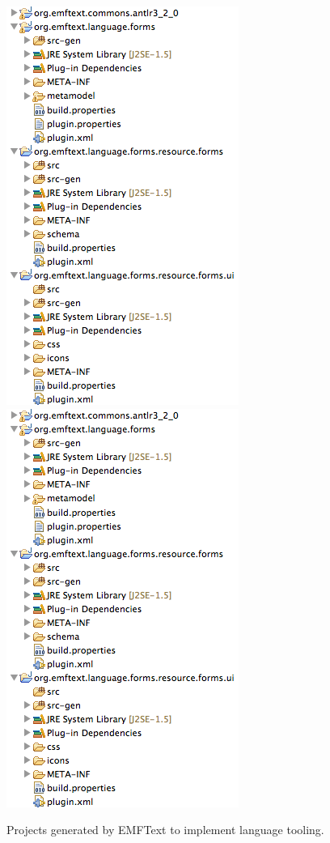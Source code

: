 	\begin{figure}[ht]
	\centering
	\ifpdf
		\includegraphics[scale=0.7]{figures/generationResults}
	\else
		\includegraphics{figures/generationResults.png}
	\fi
	\caption{Projects generated by EMFText to implement language tooling.}
	\label{fig:generationResults}
	\end{figure}

